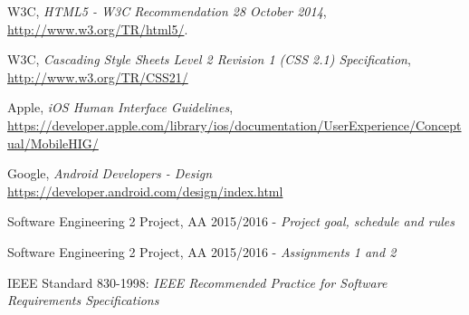 \begin{thebibliography}{1}
  W3C,
  \emph{HTML5 - W3C Recommendation 28 October 2014}, \url{http://www.w3.org/TR/html5/}.

  W3C,
  \emph{Cascading Style Sheets Level 2 Revision 1 (CSS 2.1) Specification}, \url{http://www.w3.org/TR/CSS21/}

	Apple,
	\emph{iOS Human Interface Guidelines}, \url{https://developer.apple.com/library/ios/documentation/UserExperience/Conceptual/MobileHIG/}
	
	Google,
	\emph{Android Developers - Design}
	\url{https://developer.android.com/design/index.html}
	
	Software Engineering 2 Project, AA 2015/2016 - \emph{Project goal, schedule and rules}
	
	Software Engineering 2 Project, AA 2015/2016 - \emph{Assignments 1 and 2}
	
	IEEE Standard 830-1998: \emph{IEEE Recommended Practice for Software Requirements Specifications}
	
\end{thebibliography}